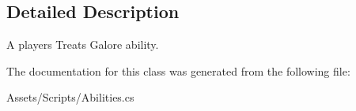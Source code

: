 \subsection{Detailed Description}
A player\textquotesingle{}s Treats Galore ability. 



The documentation for this class was generated from the following file\+:\begin{DoxyCompactItemize}
\item 
Assets/\+Scripts/Abilities.\+cs\end{DoxyCompactItemize}
